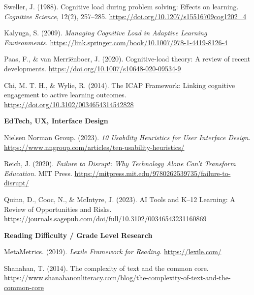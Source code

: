 \documentclass[11pt]{article}
\begin{document}
\begin{list}{}{%
  \setlength{\leftmargin}{1.5em}
  \setlength{\itemindent}{-1.5em}
  \setlength{\itemsep}{0.3em}
}
\item Sweller, J. (1988). Cognitive load during problem solving: Effects on
learning. \textit{Cognitive Science}, 12(2), 257--285.
\url{https://doi.org/10.1207/s15516709cog1202_4}
\item Kalyuga, S. (2009). \textit{Managing Cognitive Load in Adaptive Learning
Environments.} \url{https://link.springer.com/book/10.1007/978-1-4419-8126-4}
\item Paas, F., \& van Merri\"enboer, J. (2020). Cognitive-load theory: A review
of recent developments. \url{https://doi.org/10.1007/s10648-020-09534-9}
\item Chi, M. T. H., \& Wylie, R. (2014). The ICAP Framework: Linking cognitive
engagement to active learning outcomes.
\url{https://doi.org/10.3102/0034654314542828}
\end{list}

\textbf{EdTech, UX, Interface Design}

\begin{list}{}{%
  \setlength{\leftmargin}{1.5em}
  \setlength{\itemindent}{-1.5em}
  \setlength{\itemsep}{0.3em}
}
\item Nielsen Norman Group. (2023). \textit{10 Usability Heuristics for User
Interface Design.} \url{https://www.nngroup.com/articles/ten-usability-heuristics/}
\item Reich, J. (2020). \textit{Failure to Disrupt: Why Technology Alone Can't
Transform Education.} MIT Press.
\url{https://mitpress.mit.edu/9780262539735/failure-to-disrupt/}
\item Quinn, D., Cooc, N., \& McIntyre, J. (2023). AI Tools and K--12 Learning:
A Review of Opportunities and Risks.
\url{https://journals.sagepub.com/doi/full/10.3102/00346543231160869}
\end{list}

\textbf{Reading Difficulty / Grade Level Research}

\begin{list}{}{%
  \setlength{\leftmargin}{1.5em}
  \setlength{\itemindent}{-1.5em}
  \setlength{\itemsep}{0.3em}
}
\item MetaMetrics. (2019). \textit{Lexile Framework for Reading.}
\url{https://lexile.com/}
\item Shanahan, T. (2014). The complexity of text and the common core.
\url{https://www.shanahanonliteracy.com/blog/the-complexity-of-text-and-the-common-core}
\end{list}
\end{document}
